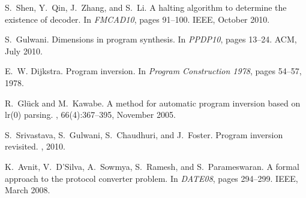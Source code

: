 \documentclass{acm_proc_article-sp}
\begin{document}
\begin{thebibliography}{10}
S.~Shen, Y.~Qin, J.~Zhang, and S.~Li.
\newblock A halting algorithm to determine the existence of decoder.
\newblock In {\em FMCAD10}, pages 91--100. IEEE, October
  2010.

S.~Gulwani.
\newblock Dimensions in program synthesis.
\newblock In {\em PPDP10}, pages 13--24. ACM, July 2010.

E.~W. Dijkstra.
\newblock Program inversion.
\newblock In {\em Program Construction 1978}, pages
  54--57, 1978.

R.~Gl\"uck and M.~Kawabe.
\newblock A method for automatic program inversion based on lr(0) parsing.
, 66(4):367--395, November 2005.

S.~Srivastava, S.~Gulwani, S.~Chaudhuri, and J.~Foster.
\newblock Program inversion revisited.
, 2010.






K.~Avnit, V.~D'Silva, A.~Sowmya, S.~Ramesh, and S.~Parameswaran.
\newblock A formal approach to the protocol converter problem.
\newblock In {\em DATE08}, pages 294--299. IEEE, March
  2008.





\end{thebibliography}


\end{document}
